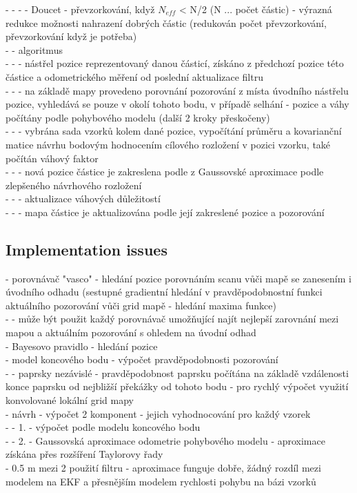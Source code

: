 \documentclass[11pt]{article}
\begin{document}
- - - - Doucet - převzorkování, když $N_{eff}$ < N/2 (N ... počet částic) - výrazná redukce možnosti nahrazení dobrých částic (redukován počet převzorkování, převzorkování když je potřeba)\\
 - - algoritmus\\
 - - - nástřel pozice reprezentovaný danou částicí, získáno z předchozí pozice této částice a odometrického měření od poslední aktualizace filtru\\
 - - - na základě mapy provedeno porovnání pozorování z místa úvodního nástřelu pozice, vyhledává se pouze v okolí tohoto bodu, v případě selhání - pozice a váhy počítány podle pohybového modelu (další 2 kroky přeskočeny)\\
 - - - vybrána sada vzorků kolem dané pozice, vypočítání průměru a kovarianční matice návrhu bodovým hodnocením cílového rozložení v pozici vzorku, také počítán váhový faktor\\
 - - -  nová pozice částice je zakreslena podle z Gaussovské aproximace podle zlepšeného návrhového rozložení\\
 - - - aktualizace váhových důležitostí\\
 - - - mapa částice je aktualizována podle její zakreslené pozice a pozorování\\
\subsection{Implementation issues}
 - porovnávač "vasco" - hledání pozice porovnáním scanu vůči mapě se zanesením i úvodního odhadu (sestupné gradientní hledání v pravděpodobnostní funkci aktuálního pozorování vůči grid mapě - hledání maxima funkce)\\
 - - může být použit každý porovnávač umožňující najít nejlepší zarovnání mezi mapou a aktuálním pozorování s ohledem na úvodní odhad\\
 - Bayesovo pravidlo - hledání pozice\\
 - model koncového bodu - výpočet pravděpodobnosti pozorování\\
 - - paprsky nezávislé - pravděpodobnost paprsku počítána na základě vzdálenosti konce paprsku od nejbližší překážky od tohoto bodu - pro rychlý výpočet využití konvolované lokální grid mapy\\
 - návrh - výpočet 2 komponent - jejich vyhodnocování pro každý vzorek\\
 - - 1. - výpočet podle modelu koncového bodu\\
 - - 2. - Gaussovská aproximace odometrie pohybového modelu - aproximace získána přes rozšíření Taylorovy řady\\
 - 0.5 m mezi 2 použití filtru - aproximace funguje dobře, žádný rozdíl mezi modelem na EKF a přesnějším  modelem rychlosti pohybu na bázi vzorků\\
\end{document}
